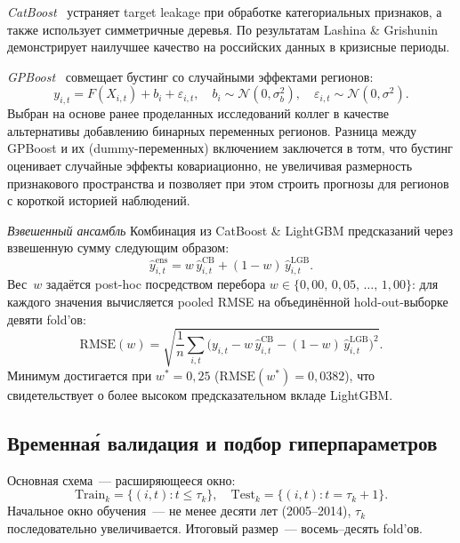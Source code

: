 \documentclass[12pt,a4paper]{article}
\begin{document}
\textit{CatBoost}~\cite{dorogush2018} устраняет target leakage при обработке категориальных признаков, а также использует симметричные деревья. По результатам Lashina \& Grishunin~\cite{lashina2023}
демонстрирует наилучшее качество на российских данных в кризисные периоды.

\textit{GPBoost}~\cite{sigrist2022} совмещает бустинг со случайными
эффектами регионов:
\begin{equation}
  y_{i,t} = F(X_{i,t}) + b_i + \varepsilon_{i,t},
  \quad b_i \sim \mathcal{N}(0,\sigma_b^2),
  \quad \varepsilon_{i,t} \sim \mathcal{N}(0,\sigma^2).
\end{equation}
Выбран на основе ранее проделанных исследований коллег в качестве альтернативы добавлению бинарных переменных регионов. Разница между GPBoost и их (dummy-переменных) включением заключется в тотм, что бустинг оценивает
случайные эффекты ковариационно, не увеличивая размерность признакового
пространства и позволяет при этом строить прогнозы для регионов с короткой историей
наблюдений.

\textit{Взвешенный ансамбль} Комбинация из CatBoost \& LightGBM предсказаний
через взвешенную сумму следующим образом:
\begin{equation}
  \hat{y}^{\mathrm{ens}}_{i,t} = w\,\hat{y}^{\mathrm{CB}}_{i,t}
  + (1-w)\,\hat{y}^{\mathrm{LGB}}_{i,t}.
\end{equation}
Вес~$w$ задаётся post-hoc посредством перебора
$w \in \{0{,}00,\,0{,}05,\,\ldots,\,1{,}00\}$: для каждого значения
вычисляется pooled RMSE на объединённой hold-out-выборке девяти fold'ов:
\begin{equation}
  \mathrm{RMSE}(w) = \sqrt{\frac{1}{n}\sum_{i,t}\bigl(y_{i,t}
  - w\,\hat{y}^{\mathrm{CB}}_{i,t}
  - (1-w)\,\hat{y}^{\mathrm{LGB}}_{i,t}\bigr)^2}.
\end{equation}
Минимум достигается при $w^* = 0{,}25$ ($\mathrm{RMSE}(w^*) = 0{,}0382$),
что свидетельствует о более высоком предсказательном вкладе LightGBM.

\subsection{Временна\'{я} валидация и подбор гиперпараметров}

Основная схема~--- расширяющееся окно:
\begin{equation}
  \mathrm{Train}_k = \{(i,t) : t \le \tau_k\},\quad
  \mathrm{Test}_k = \{(i,t) : t = \tau_k + 1\}.
\end{equation}
Начальное окно обучения~--- не менее десяти лет (2005--2014),
$\tau_k$ последовательно увеличивается. Итоговый размер~--- восемь--десять
fold'ов.
\end{document}
